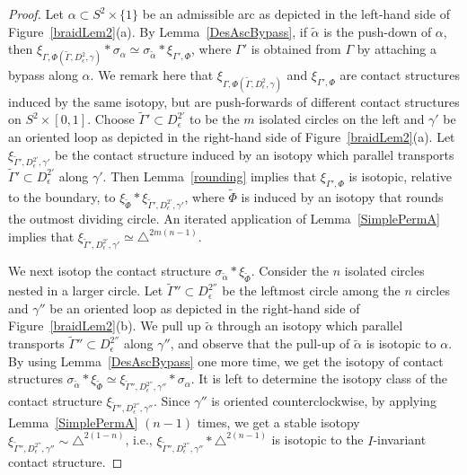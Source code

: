 \documentclass[12pt]{amsart}
\theoremstyle{remark}
\begin{document}
\begin{proof}
Let $\alpha\subset S^2\times\{1\}$ be an admissible arc as depicted in the left-hand side of Figure~\ref{braidLem2}(a). By Lemma~\ref{DesAscBypass}, if $\tilde\alpha$ is the push-down of $\alpha$, then $\xi_{\Gamma,\Phi(\tilde\Gamma,D^2_\epsilon,\gamma)}\ast\sigma_\alpha \simeq \sigma_{\tilde\alpha}\ast\xi_{\Gamma',\Phi}$, where $\Gamma'$ is obtained from $\Gamma$ by attaching a bypass along $\alpha$. We remark here that $\xi_{\Gamma,\Phi(\tilde\Gamma,D^2_\epsilon,\gamma)}$ and $\xi_{\Gamma',\Phi}$ are contact structures induced by the same isotopy, but are push-forwards of different contact structures on $S^2\times[0,1]$. Choose $\tilde\Gamma'\subset D^{2'}_\epsilon$ to be the $m$ isolated circles on the left and $\gamma'$ be an oriented loop as depicted in the right-hand side of Figure~\ref{braidLem2}(a). Let $\xi_{\tilde\Gamma',D^{2'}_\epsilon,\gamma'}$ be the contact structure induced by an isotopy which parallel transports $\tilde\Gamma'\subset D^{2'}_\epsilon$ along $\gamma'$. Then Lemma~\ref{rounding} implies that $\xi_{\Gamma',\Phi}$ is isotopic, relative to the boundary, to $\xi_{\tilde\Phi}\ast\xi_{\tilde\Gamma',D^{2'}_\epsilon,\gamma'}$, where $\tilde\Phi$ is induced by an isotopy that rounds the outmost dividing circle. An iterated application of Lemma~\ref{SimplePermA} implies that $\xi_{\tilde\Gamma',D^{2'}_\epsilon,\gamma'} \simeq \triangle^{2m(n-1)}$.

We next isotop the contact structure $\sigma_{\tilde\alpha}\ast\xi_{\tilde\Phi}$. Consider the $n$ isolated circles nested in a larger circle. Let $\tilde\Gamma''\subset D^{2''}_\epsilon$ be the leftmost circle among the $n$ circles and $\gamma''$ be an oriented loop as depicted in the right-hand side of Figure~\ref{braidLem2}(b). We pull up $\tilde\alpha$ through an isotopy which parallel transports $\tilde\Gamma''\subset D^{2''}_\epsilon$ along $\gamma''$, and observe that the pull-up of $\tilde\alpha$ is isotopic to $\alpha$. By using Lemma~\ref{DesAscBypass} one more time, we get the isotopy of contact structures $\sigma_{\tilde\alpha}\ast\xi_{\tilde\Phi} \simeq \xi_{\tilde\Gamma'',D^{2''}_\epsilon,\gamma''}\ast\sigma_\alpha$. It is left to determine the isotopy class of the contact structure $\xi_{\tilde\Gamma'',D^{2''}_\epsilon,\gamma''}$. Since $\gamma''$ is oriented counterclockwise, by applying Lemma~\ref{SimplePermA} $(n-1)$ times, we get a stable isotopy $\xi_{\tilde\Gamma'',D^{2''}_\epsilon,\gamma''} \sim \triangle^{2(1-n)}$, i.e., $\xi_{\tilde\Gamma'',D^{2''}_\epsilon,\gamma''}\ast\triangle^{2(n-1)}$ is isotopic to the $I$-invariant contact structure.



\end{proof}
\end{document}
